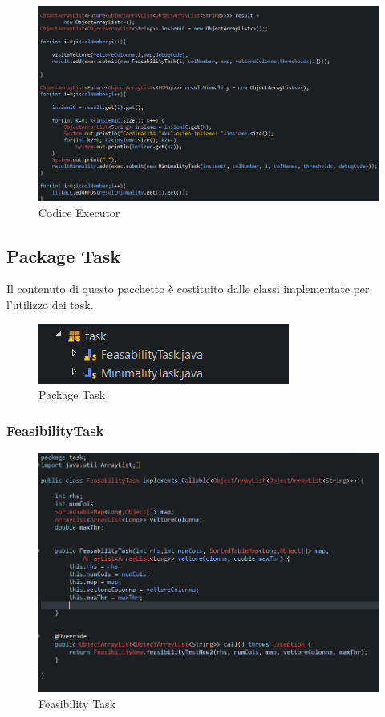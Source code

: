 \begin{figure}[H]
	\includegraphics[scale=0.70]{Immagini/Executor.PNG}
	\caption{Codice Executor}
	\label{fig:Codice Executor}
\end{figure}

\subsection{Package Task}
Il contenuto di questo pacchetto è costituito dalle classi implementate per l'utilizzo dei task.
\begin{figure}[H]
	\centering
	\includegraphics{Immagini/PackageTask.PNG}
	\caption{Package Task}
	\label{fig:Package Task}
\end{figure}
\subsubsection{FeasibilityTask}
\begin{figure}[H]
	\centering
	\includegraphics[scale=0.80]{Immagini/FeasibilityTask.PNG}
	\caption{Feasibility Task}
	\label{fig:Feasibility Task}
\end{figure}
